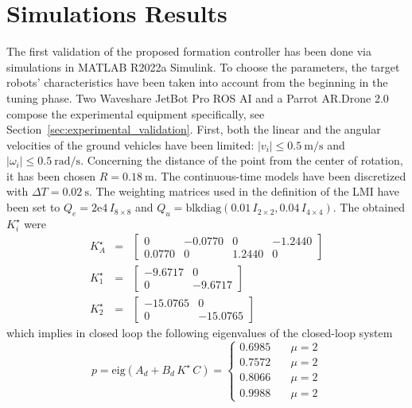 \documentclass{ifacconf}
\begin{document}
\section{Simulations Results}
\label{sec:simulation_results}
The first validation of the proposed formation 
controller has been done via simulations in MATLAB R2022a Simulink.
To choose the parameters, the target robots' characteristics 
have been taken into account from the beginning 
in the tuning phase.
Two Waveshare JetBot Pro ROS AI and a Parrot AR.Drone 2.0 
compose the experimental equipment specifically, 
see Section~\ref{sec:experimental_validation}.
First, both the linear and the angular velocities 
of the ground vehicles have been limited: 
$\left\lvert v_i \right\rvert \leq \SI{0.5}{\meter\per\second}$ and 
$\left\lvert \omega_i\right\rvert \leq \SI{0.5}{\radian\per\second}$.
Concerning the distance of the point from the center of rotation, 
it has been chosen $R = \SI{0.18}{\meter}$.
The continuous-time models have been 
discretized with
$\Delta T = \SI{0.02}{\second}$.
The weighting matrices used in the definition 
of the LMI have been set to 
$Q_e = 2\mathrm{e}4 \, I_{8 \times 8}$ and 
$Q_u =\text{blkdiag}(0.01 \, I_{2\times2}, 0.04 \, I_{4\times4})$.
The obtained $K^\star_i$ were 
\begin{eqnarray}
    K^\star_A &=& \begin{bmatrix}
        0  &  -0.0770    &     0  &  -1.2440 \\
        0.0770 &     0       & 1.2440 &      0
    \end{bmatrix}\\
    K^\star_1 &=& \begin{bmatrix}
        -9.6717 & 0 \\
         0   & -9.6717
    \end{bmatrix}\\
    K^\star_2 &=& \begin{bmatrix}
        -15.0765 & 0 \\
         0   & -15.0765
    \end{bmatrix}
\end{eqnarray}
which implies in closed loop the following 
eigenvalues of the closed-loop system
\begin{equation}
    p = \text{eig}(A_d + B_d \, K^\star \, C) = 
    \begin{cases}
        0.6985 \quad & \mu = 2\\
        0.7572 \quad & \mu = 2\\
        0.8066 \quad & \mu = 2\\
        0.9988 \quad  &   \mu = 2
    \end{cases}
\end{equation}
\end{document}
